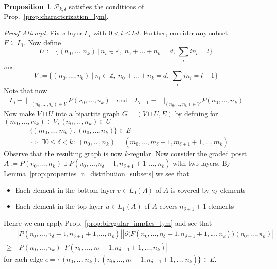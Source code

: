 \documentclass{scrartcl}
\newcommand{\Z}{\mathbb{Z}}
\theoremstyle{definition}
\newtheorem{proposition}[definition]{Proposition}
\begin{document}
\begin{proposition}
    $\mathcal{P}_{k, d}$ satisfies the conditions of Prop.~\ref{prop:characterization_lym}.
\end{proposition}
\textit{Proof Attempt.}
Fix a layer $L_l$ with $0 < l \leq kd$.
Further, consider any subset $F \subseteq L_l$.
Now define
\begin{equation*}
    U := \{ (n_0, ..., n_k) \ | \ n_i \in \Z, \ n_0 + ... + n_k = d, \ \sum_i i n_i = l \}
\end{equation*}
and
\begin{equation*}
    V := \{ (n_0, ..., n_k) \ | \ n_i \in \Z, \ n_0 + ... + n_k = d, \ \sum_i i n_i = l - 1 \}
\end{equation*}
Note that now
\begin{align*}
    L_l = \bigsqcup_{(n_0, ..., n_k) \in U} P(n_0, ..., n_k) \quad \text{and} \quad L_{l - 1} = \bigsqcup_{(n_0, ..., n_k) \in V} P(n_0, ..., n_k)
\end{align*}
Now make $V \sqcup U$ into a bipartite graph $G = (V \sqcup U, E)$ by defining for $(m_0, ..., m_k) \in V, (n_0, ..., n_k) \in U$
\begin{align*}
    &\{ (m_0, ..., m_k), (n_0, ..., n_k) \} \in E \\
    &\Leftrightarrow \ \exists 0 \leq \delta < k: \ (n_0, ..., n_k) = (m_0, ..., m_\delta - 1, m_{\delta + 1} + 1, ..., m_k)
\end{align*}
Observe that the resulting graph is now $k$-regular.
Now consider the graded poset $A := P(n_0, ..., n_k) \sqcup P(n_0, ..., n_\delta - 1, n_{\delta + 1} + 1, ..., n_k)$ with two layers.
By Lemma~\ref{prop:properties_n_distribution_subsets} we see that
\begin{itemize}
    \item Each element in the bottom layer $v \in L_0(A)$ of $A$ is covered by $n_\delta$ elements
    \item Each element in the top layer $u \in L_1(A)$ of $A$ covers $n_{\delta + 1} + 1$ elements
\end{itemize}
Hence we can apply Prop.~\ref{prop:biregular_implies_lym} and see that
\begin{align*}
    &{|P(n_0, ..., n_\delta - 1, n_{\delta + 1} + 1, ..., n_k)|} {|\partial \bigl(F(n_0, ..., n_\delta - 1, n_{\delta + 1} + 1, ..., n_k)\bigr)(n_0, ..., n_k)|} \\
    \geq &{|P(n_0, ..., n_k)|} {|F(n_0, ..., n_\delta - 1, n_{\delta + 1} + 1, ..., n_k)|}
\end{align*}
for each edge $e = \{ (n_0, ..., n_k), (n_0, ..., n_\delta - 1, n_{\delta + 1} + 1, ..., n_k) \} \in E$.
\end{document}
